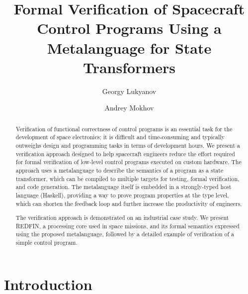 \documentclass[sigplan,10pt,review,anonymous]{acmart}
\begin{document}
\title{$\!\!\!$Formal Verification of Spacecraft Control Programs$\!\!\!$ Using a Metalanguage for State Transformers}

\author{Georgy Lukyanov}
\author{Andrey Mokhov}

{
   \fancyhf{}
   \renewcommand{\headrulewidth}{0.2pt}
}

\begin{abstract}
Verification of functional correctness of control programs is an essential task
for the development of space electronics; it is difficult and time-consuming and
typically outweighs design and programming tasks in terms of development hours.
We present a verification approach designed to help spacecraft engineers reduce
the effort required for formal verification of low-level control programs executed
on custom hardware. The approach uses a metalanguage to describe the semantics
of a program as a state transformer, which can be compiled to multiple targets
for testing, formal verification, and code generation. The metalanguage itself
is embedded in a strongly-typed host language (Haskell), providing a way to prove
program properties at the type level, which can shorten the feedback loop and
further increase the productivity of engineers.

The verification approach is demonstrated on an industrial case study.
We present REDFIN, a processing core used in space missions, and its formal
semantics expressed using the proposed metalanguage, followed by a detailed
example of verification of a simple control program.

\end{abstract}

\maketitle

\section{Introduction}

\end{document}

